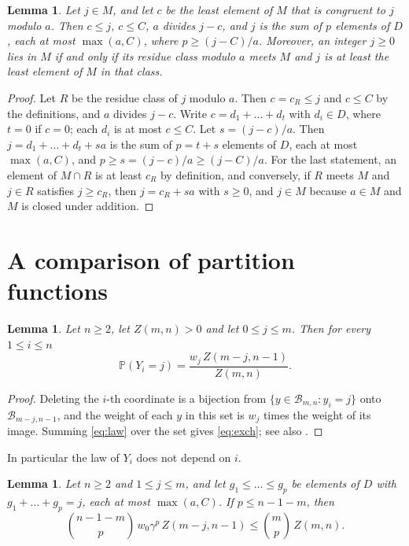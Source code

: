 \documentclass[11pt]{amsart}
\newtheorem{lemma}[theorem]{Lemma}
\theoremstyle{remark}
\numberwithin{equation}{section}
\newcommand{\Pp}{\mathbb P}
\newcommand{\cB}{\mathcal B}
\begin{document}
\begin{lemma}\label{lem:arith}
Let $j\in M$, and let $c$ be the least element of $M$ that is congruent to $j$ modulo $a$. Then $c\le j$, $c\le C$, $a$ divides $j-c$, and $j$ is the sum of $p$ elements of $D$, each at most $\max(a,C)$, where $p\ge(j-C)/a$. Moreover, an integer $j\ge0$ lies in $M$ if and only if its residue class modulo $a$ meets $M$ and $j$ is at least the least element of $M$ in that class.
\end{lemma}

\begin{proof}
Let $R$ be the residue class of $j$ modulo $a$. Then $c=c_R\le j$ and $c\le C$ by the definitions, and $a$ divides $j-c$. Write $c=d_1+\dots+d_t$ with $d_i\in D$, where $t=0$ if $c=0$; each $d_i$ is at most $c\le C$. Let $s=(j-c)/a$. Then $j=d_1+\dots+d_t+sa$ is the sum of $p=t+s$ elements of $D$, each at most $\max(a,C)$, and $p\ge s=(j-c)/a\ge(j-C)/a$. For the last statement, an element of $M\cap R$ is at least $c_R$ by definition, and conversely, if $R$ meets $M$ and $j\in R$ satisfies $j\ge c_R$, then $j=c_R+sa$ with $s\ge0$, and $j\in M$ because $a\in M$ and $M$ is closed under addition.
\end{proof}

\section{A comparison of partition functions}\label{sec:compare}

\begin{lemma}\label{lem:exch}
Let $n\ge2$, let $Z(m,n)>0$ and let $0\le j\le m$. Then for every $1\le i\le n$
\begin{equation}\label{eq:exch}
\Pp(Y_i=j)=\frac{w_j\,Z(m-j,n-1)}{Z(m,n)}.
\end{equation}
\end{lemma}

\begin{proof}
Deleting the $i$-th coordinate is a bijection from $\{y\in\cB_{m,n}:y_i=j\}$ onto $\cB_{m-j,n-1}$, and the weight of each $y$ in this set is $w_j$ times the weight of its image. Summing \eqref{eq:law} over the set gives \eqref{eq:exch}; see also \cite[(18.11)]{J12}.
\end{proof}

In particular the law of $Y_i$ does not depend on $i$.

\begin{lemma}\label{lem:compare}
Let $n\ge2$ and $1\le j\le m$, and let $g_1\le\dots\le g_p$ be elements of $D$ with $g_1+\dots+g_p=j$, each at most $\max(a,C)$. If $p\le n-1-m$, then
\begin{equation}\label{eq:compare}
\binom{n-1-m}{p}\,w_0\gamma^p\,Z(m-j,n-1)\le\binom mp\,Z(m,n).
\end{equation}
\end{lemma}
\end{document}
